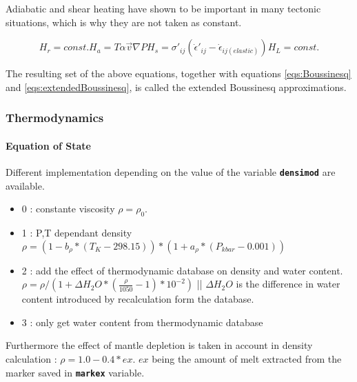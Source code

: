 Adiabatic and shear heating have shown to be important in many tectonic situations, which is why they are not taken as constant.

\begin{subequations}\label{eqs:extendedBoussinesq}
\begin{equation}
H_r = const.
\end{equation}
\begin{equation}
H_a = T \alpha \vec{v} \nabla P
\end{equation}
\begin{equation}
H_s = \sigma'_{ij} \left(\dot{\epsilon}'_{ij} - \dot{\epsilon}_{ij(elastic)} \right)
\end{equation}
\begin{equation}
H_L = const.
\end{equation}
\end{subequations}

The resulting set of the above equations, together with equations \eqref{eqs:Boussinesq} and \eqref{eqs:extendedBoussinesq}, is called the extended Boussinesq approximations.

\subsubsection{Thermodynamics}

\paragraph{Equation of State}
Different implementation depending on the value of the variable \textbf{\texttt{densimod}} are available.
\begin{itemize}
 \item 0 : constante viscosity $\rho = \rho_0 $.
 \item 1 : P,T dependant density $\rho = (1- b_{\rho}*(T_K-298.15))*(1+ a_{\rho}*(P_{kbar}-0.001))$
 \item 2 : add the effect of thermodynamic database on density and water content. \\
 $ \rho = \rho / (1 + \Delta H_2O * (\frac{\rho}{1050}-1) *10^{-2})$ || $\Delta H_2O$ is the difference in water content introduced by recalculation form the database.
 \item 3 : only get water content from thermodynamic database
\end{itemize}
Furthermore the effect of mantle depletion is taken in account in density calculation : 
$\rho = 1.0 - 0.4 * ex$. $ex$ being the amount of melt extracted from the marker saved in \textbf{\texttt{markex}} variable.


